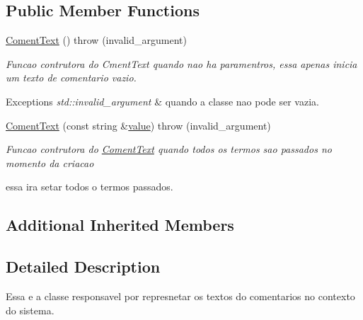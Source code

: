 \subsection*{Public Member Functions}
\begin{DoxyCompactItemize}
\item 
\hypertarget{class_coment_text_a7c8c9aa482e3f4a2b9e4aa194b946814}{\hyperlink{class_coment_text_a7c8c9aa482e3f4a2b9e4aa194b946814}{Coment\-Text} ()  throw (invalid\-\_\-argument)}\label{class_coment_text_a7c8c9aa482e3f4a2b9e4aa194b946814}

\begin{DoxyCompactList}\small\item\em Funcao contrutora do Cment\-Text quando nao ha paramentros, essa apenas inicia um texto de comentario vazio. 
\begin{DoxyExceptions}{Exceptions}
{\em std\-::invalid\-\_\-argument} & quando a classe nao pode ser vazia. \\
\hline
\end{DoxyExceptions}
\end{DoxyCompactList}\item 
\hyperlink{class_coment_text_a9e8f0908ebb65c6debeaf1ccfde2041d}{Coment\-Text} (const string \&\hyperlink{class_basic_type_af9b2c5cc32647df01083a6802e913dbf}{value})  throw (invalid\-\_\-argument)
\begin{DoxyCompactList}\small\item\em Funcao contrutora do \hyperlink{class_coment_text}{Coment\-Text} quando todos os termos sao passados no momento da criacao \par
 essa ira setar todos o termos passados. \end{DoxyCompactList}\end{DoxyCompactItemize}
\subsection*{Additional Inherited Members}


\subsection{Detailed Description}
Essa e a classe responsavel por represnetar os textos do comentarios no contexto do sistema. 

